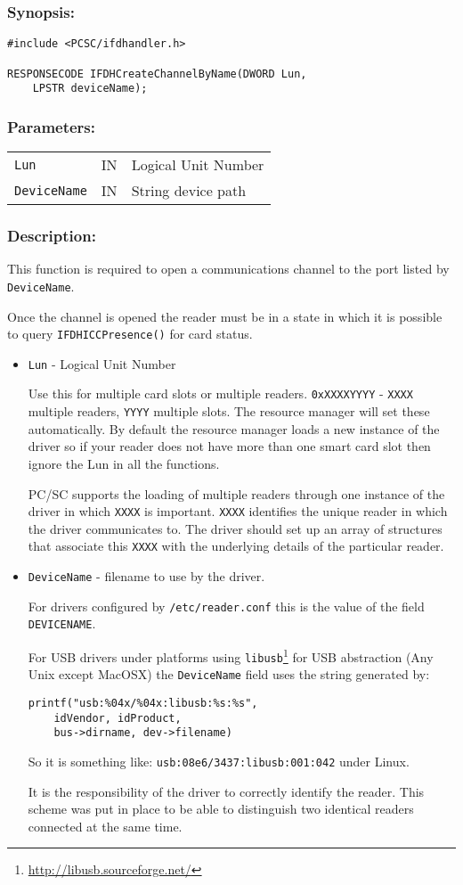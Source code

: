 \documentclass[a4paper,12pt]{article}
\newcommand{\synopsis}{\subsubsection{Synopsis:}}
\newcommand{\parameters}{\subsubsection{Parameters:}}
\newcommand{\desc}{\subsubsection{Description:}}
\begin{document}
\synopsis
\begin{verbatim}
#include <PCSC/ifdhandler.h>

RESPONSECODE IFDHCreateChannelByName(DWORD Lun,
    LPSTR deviceName);
\end{verbatim}

\parameters

\begin{tabular}{lll}
\texttt{Lun} & IN & Logical Unit Number \\
\texttt{DeviceName} & IN & String device path \\
\end{tabular}


\desc

This function is required to open a communications channel to the port
listed by \texttt{DeviceName}.

Once the channel is opened the reader must be in a state in which it is
possible to query \texttt{IFDHICCPresence()} for card status.

\begin{itemize}
\item \texttt{Lun} - Logical Unit Number

Use this for multiple card slots or multiple readers.
\texttt{0xXXXXYYYY} - \texttt{XXXX} multiple readers, \texttt{YYYY}
multiple slots. The resource manager will set these automatically. By
default the resource manager loads a new instance of the driver so if
your reader does not have more than one smart card slot then ignore the
Lun in all the functions.

PC/SC supports the loading of multiple readers through one instance of
the driver in which \texttt{XXXX} is important. \texttt{XXXX} identifies
the unique reader in which the driver communicates to. The driver should
set up an array of structures that associate this \texttt{XXXX} with the
underlying details of the particular reader.

\item \texttt{DeviceName} - filename to use by the driver.

For drivers configured by \texttt{/etc/reader.conf} this is the value of
the field \texttt{DEVICENAME}.

For USB drivers under platforms using
\texttt{libusb}\footnote{\url{http://libusb.sourceforge.net/}} for USB
abstraction (Any Unix except MacOSX) the \texttt{DeviceName} field uses
the string generated by:
\begin{verbatim}
printf("usb:%04x/%04x:libusb:%s:%s",
    idVendor, idProduct,
    bus->dirname, dev->filename)
\end{verbatim}

So it is something like: \texttt{usb:08e6/3437:libusb:001:042} under
Linux.

It is the responsibility of the driver to correctly identify the reader.
This scheme was put in place to be able to distinguish two identical
readers connected at the same time.

\end{itemize}
\end{document}
